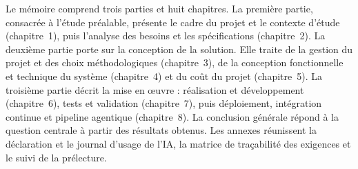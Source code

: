 Le mémoire comprend trois parties et huit chapitres. La première partie, consacrée à l'étude préalable, présente le cadre du projet et le contexte d'étude (chapitre~1), puis l'analyse des besoins et les spécifications (chapitre~2). La deuxième partie porte sur la conception de la solution. Elle traite de la gestion du projet et des choix méthodologiques (chapitre~3), de la conception fonctionnelle et technique du système (chapitre~4) et du coût du projet (chapitre~5). La troisième partie décrit la mise en œuvre : réalisation et développement (chapitre~6), tests et validation (chapitre~7), puis déploiement, intégration continue et pipeline agentique (chapitre~8). La conclusion générale répond à la question centrale à partir des résultats obtenus. Les annexes réunissent la déclaration et le journal d'usage de l'IA, la matrice de traçabilité des exigences et le suivi de la prélecture.
